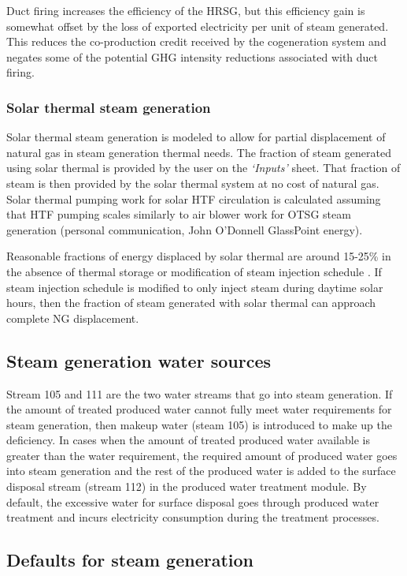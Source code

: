 \documentclass[11pt]{report}
\newcommand{\sheet}[1]{\textit{`{#1}'}}
\begin{document}
Duct firing increases the efficiency of the HRSG, but this efficiency gain is somewhat offset by the loss of exported electricity per unit of steam generated. This reduces the co-production credit received by the cogeneration system and negates some of the potential GHG intensity reductions associated with duct firing.


\subsubsection{Solar thermal steam generation}
\label{solarthermal}

  Solar thermal steam generation is modeled to allow for partial displacement of natural gas in steam generation thermal needs.  The fraction of steam generated using solar thermal is provided by the user on the \sheet{Inputs} sheet.  That fraction of steam is then provided by the solar thermal system at no cost of natural gas. Solar thermal pumping work for solar HTF circulation is calculated assuming that HTF pumping scales similarly to air blower work for OTSG steam generation (personal communication, John O'Donnell GlassPoint energy).

Reasonable fractions of energy displaced by solar thermal are around 15-25\% in the absence of thermal storage or modification of steam injection schedule \cite{Wang2016, Sandler2014, Palmer2015}. If steam injection schedule is modified to only inject steam during daytime solar hours, then the fraction of steam generated with solar thermal can approach complete NG displacement.

\subsection{Steam generation water sources}
Stream 105 and 111 are the two water streams that go into steam generation. If the amount of treated produced water cannot fully meet water requirements for steam generation, then makeup water (steam 105) is introduced to make up the deficiency. In cases when the amount of treated produced water available is greater than the water requirement, the required amount of produced water goes into steam generation and the rest of the produced water is added to the surface disposal stream (stream 112) in the produced water treatment module. By default, the excessive water for surface disposal goes through produced water treatment and incurs electricity consumption during the treatment processes.


\subsection{Defaults for steam generation}
\end{document}
